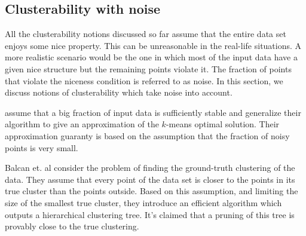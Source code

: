 \documentclass[twoside]{article}
\newcommand{\mc}{\mathcal}
\newtheorem{definition}[theorem]{Definition}
\begin{document}

\subsection{Clusterability with noise}
All the clusterability notions discussed so far assume that the entire data set enjoys some nice property. This can be unreasonable in the real-life situations. A more realistic scenario would be the one in which most of the input data have a given nice structure but the remaining points violate it. The fraction of points that violate the niceness condition is referred to as noise.
In this section, we discuss notions of clusterability which take noise into account. 



\cite{balcan2012clustering} assume that a big fraction of input data is sufficiently stable and generalize their algorithm to give an approximation of the $k$-means optimal solution. Their approximation guaranty is based on the assumption that the fraction of noisy points is very small.

Balcan et. al \cite{balcan2008discriminative} consider the problem of finding the ground-truth clustering of the data. They assume that every point of the data set is closer to the points in its true cluster than the points outside. Based on this assumption, and limiting the size of the smallest true cluster, they introduce an efficient algorithm which outputs a hierarchical clustering tree. It's claimed that a pruning of this tree is provably close to the true clustering.
\end{document}
